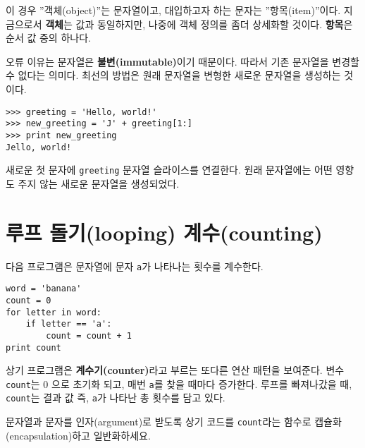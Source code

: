 이 경우 ''객체(object)''는 문자열이고, 대입하고자 하는 문자는 ''항목(item)''이다. 
지금으로서 {\bf 객체}는 값과 동일하지만, 나중에 객체 정의를 좀더 상세화할 것이다.
{\bf 항목}은 순서 값 중의 하나다.


오류 이유는 문자열은 {\bf 불변(immutable)}이기 때문이다. 
따라서 기존 문자열을 변경할 수 없다는 의미다.
최선의 방법은 원래 문자열을 변형한 새로운 문자열을 생성하는 것이다.

\beforeverb
\begin{verbatim}
>>> greeting = 'Hello, world!'
>>> new_greeting = 'J' + greeting[1:]
>>> print new_greeting
Jello, world!
\end{verbatim}
\afterverb
%

새로운 첫 문자에 {\tt greeting} 문자열 슬라이스를 연결한다. 
원래 문자열에는 어떤 영향도 주지 않는 새로운 문자열을 생성되었다.


\section{    루프 돌기(looping) 계수(counting)}
\label{counter}


다음 프로그램은 문자열에 문자 {\tt a}가 나타나는 횟수를 계수한다.

\beforeverb
\begin{verbatim}
word = 'banana'
count = 0
for letter in word:
    if letter == 'a':
        count = count + 1
print count
\end{verbatim}
\afterverb
%

상기 프로그램은 {\bf 계수기(counter)}라고 부르는 또다른 연산 패턴을 보여준다. 
변수 {\tt count}는 0 으로 초기화 되고, 매번 {\tt a}를 찾을 때마다 증가한다.
루프를 빠져나갔을 때, {\tt count}는 결과 값 즉, {\tt a}가 나타난 총 횟수를 담고 있다.

\begin{ex}

문자열과 문자를 인자(argument)로 받도록 상기 코드를 {\tt count}라는 함수로 캡슐화(encapsulation)하고 일반화하세요.

\end{ex}

